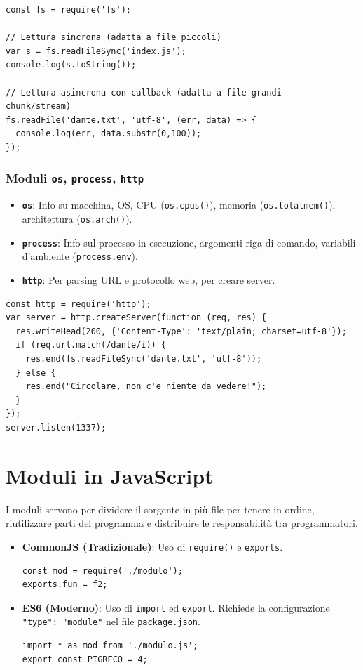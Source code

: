\documentclass[12pt,a4paper]{article}
\begin{document}
\begin{lstlisting}
const fs = require('fs');

// Lettura sincrona (adatta a file piccoli)
var s = fs.readFileSync('index.js');
console.log(s.toString());

// Lettura asincrona con callback (adatta a file grandi - chunk/stream)
fs.readFile('dante.txt', 'utf-8', (err, data) => {
  console.log(err, data.substr(0,100));
});
\end{lstlisting}

\subsubsection{Moduli \texttt{os}, \texttt{process}, \texttt{http}}
\begin{itemize}
    \item \textbf{\texttt{os}}: Info su macchina, OS, CPU (\texttt{os.cpus()}), memoria (\texttt{os.totalmem()}), architettura (\texttt{os.arch()}).
    \item \textbf{\texttt{process}}: Info sul processo in esecuzione, argomenti riga di comando, variabili d'ambiente (\texttt{process.env}).
    \item \textbf{\texttt{http}}: Per parsing URL e protocollo web, per creare server.
\end{itemize}

\begin{lstlisting}
const http = require('http');
var server = http.createServer(function (req, res) {
  res.writeHead(200, {'Content-Type': 'text/plain; charset=utf-8'});
  if (req.url.match(/dante/i)) {
    res.end(fs.readFileSync('dante.txt', 'utf-8'));
  } else {
    res.end("Circolare, non c'e niente da vedere!");
  }
});
server.listen(1337);
\end{lstlisting}

\section{Moduli in JavaScript}

I moduli servono per dividere il sorgente in più file per tenere in ordine, riutilizzare parti del programma e distribuire le responsabilità tra programmatori.

\begin{itemize}
    \item \textbf{CommonJS (Tradizionale)}: Uso di \texttt{require()} e \texttt{exports}.
\begin{lstlisting}
const mod = require('./modulo');
exports.fun = f2;
\end{lstlisting}
    \item \textbf{ES6 (Moderno)}: Uso di \texttt{import} ed \texttt{export}. Richiede la configurazione \texttt{"type": "module"} nel file \texttt{package.json}.
\begin{lstlisting}
import * as mod from './modulo.js';
export const PIGRECO = 4;
\end{lstlisting}
\end{itemize}
\end{document}
